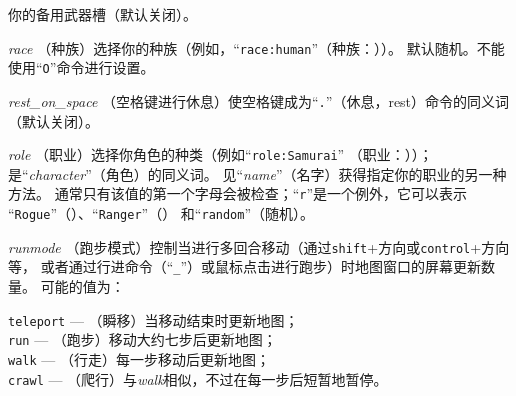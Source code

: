 \documentclass[a4paper, 10pt]{article}
\newcommand{\ib}[1]{\it #1 \hfill}
\begin{document}
你的备用武器槽（默认关闭）。
\item[\ib{race}]
（种族）选择你的种族（例如，“{\tt race:human}”（种族：\zhTransHumans））。
默认随机。不能使用“{\tt O}”命令进行设置。
\item[\ib{rest\_on\_space}]
（空格键进行休息）使空格键成为“{\tt .}”（休息，rest）命令的同义词（默认关闭）。
\item[\ib{role}]
（职业）选择你角色的种类（例如“{\tt role:Samurai}”
（职业：\zhTransSamurai））；是“{\it character\/}”（角色）的同义词。
见“{\it name\/}”（名字）获得指定你的职业的另一种方法。
通常只有该值的第一个字母会被检查；“{\tt r}”是一个例外，它可以表示
“{\tt Rogue}”（\zhTransRogues）、“{\tt Ranger}”（\zhTransRangers）
和“{\tt random}”（随机）。
\item[\ib{runmode}]
（跑步模式）控制当进行多回合移动（通过{\tt shift}+方向或{\tt control}+方向等，
或者通过行进命令（“{\tt _}”）或鼠标点击进行跑步）时地图窗口的屏幕更新数量。
可能的值为：

{\tt teleport} --- （瞬移）当移动结束时更新地图；\\
{\tt run} --- （跑步）移动大约七步后更新地图；\\
{\tt walk} --- （行走）每一步移动后更新地图；\\
{\tt crawl} --- （爬行）与{\it walk\/}相似，不过在每一步后短暂地暂停。
\end{document}
